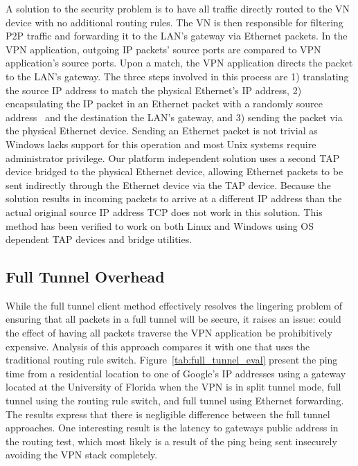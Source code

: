 A solution to the security problem is to have all traffic directly routed to
the VN device with no additional routing rules.  The VN is then responsible for
filtering P2P traffic and forwarding it to the LAN's gateway via Ethernet
packets.  In the VPN application, outgoing IP packets' source ports are
compared to VPN application's source ports.  Upon a match, the VPN application
directs the packet to the LAN's gateway.  The three steps involved in this
process are 1) translating the source IP address to match the physical
Ethernet's IP address, 2) encapsulating the IP packet in an Ethernet packet
with a randomly source address~\cite{sc09} and the destination the LAN's
gateway, and 3) sending the packet via the physical Ethernet device.  Sending
an Ethernet packet is not trivial as Windows lacks support for this operation
and most Unix systems require administrator privilege.  Our platform
independent solution uses a second TAP device bridged to the physical Ethernet
device, allowing Ethernet packets to be sent indirectly through the Ethernet
device via the TAP device.  Because the solution results in incoming packets to
arrive at a different IP address than the actual original source IP address TCP
does not work in this solution.  This method has been verified to work on both
Linux and Windows using OS dependent TAP devices and bridge utilities.

\subsection{Full Tunnel Overhead}
\label{full_tunnel_eval}
While the full tunnel client method effectively resolves the lingering problem
of ensuring that all packets in a full tunnel will be secure, it raises an
issue:  could the effect of having all packets traverse the VPN application be
prohibitively expensive.  Analysis of this approach compares it with one that
uses the traditional routing rule switch.  Figure~\ref{tab:full_tunnel_eval}
present the ping time from a residential location to one of Google's IP
addresses using a gateway located at the University of Florida when the VPN is
in split tunnel mode, full tunnel using the routing rule switch, and full
tunnel using Ethernet forwarding.  The results express that there is negligible
difference between the full tunnel approaches.  One interesting result is the
latency to gateways public address in the routing test, which most likely is a
result of the ping being sent insecurely avoiding the VPN stack completely.

